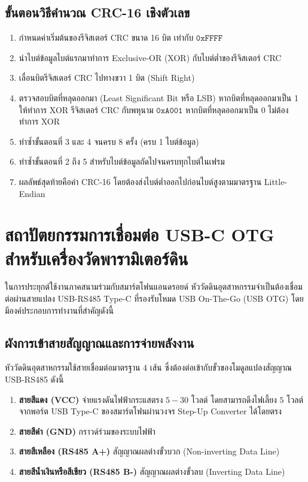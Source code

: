 \subsection{ขั้นตอนวิธีคำนวณ CRC-16 เชิงตัวเลข}
\begin{enumerate}
    \item กำหนดค่าเริ่มต้นของรีจิสเตอร์ CRC ขนาด 16 บิต เท่ากับ $\mathtt{0xFFFF}$
    \item นำไบต์ข้อมูลไบต์แรกมาทำการ Exclusive-OR (XOR) กับไบต์ต่ำของรีจิสเตอร์ CRC
    \item เลื่อนบิตรีจิสเตอร์ CRC ไปทางขวา 1 บิต (Shift Right)
    \item ตรวจสอบบิตที่หลุดออกมา (Least Significant Bit หรือ LSB)
    หากบิตที่หลุดออกมาเป็น 1 ให้ทำการ XOR รีจิสเตอร์ CRC กับพหุนาม $\mathtt{0xA001}$
    หากบิตที่หลุดออกมาเป็น 0 ไม่ต้องทำการ XOR
    \item ทำซ้ำขั้นตอนที่ 3 และ 4 จนครบ 8 ครั้ง (ครบ 1 ไบต์ข้อมูล)
    \item ทำซ้ำขั้นตอนที่ 2 ถึง 5 สำหรับไบต์ข้อมูลถัดไปจนครบทุกไบต์ในเฟรม
    \item ผลลัพธ์สุดท้ายคือค่า CRC-16 โดยต้องส่งไบต์ต่ำออกไปก่อนไบต์สูงตามมาตรฐาน Little-Endian
\end{enumerate}

\section{สถาปัตยกรรมการเชื่อมต่อ USB-C OTG สำหรับเครื่องวัดพารามิเตอร์ดิน}

ในการประยุกต์ใช้งานภาคสนามร่วมกับสมาร์ตโฟนแอนดรอยด์ หัววัดดินอุตสาหกรรมจำเป็นต้องเชื่อมต่อผ่านสายแปลง USB-RS485 Type-C ที่รองรับโหมด USB On-The-Go (USB OTG) โดยมีองค์ประกอบการทำงานที่สำคัญดังนี้

\subsection{ผังการเข้าสายสัญญาณและการจ่ายพลังงาน}
หัววัดดินอุตสาหกรรมใช้สายเชื่อมต่อมาตรฐาน 4 เส้น ซึ่งต้องต่อเข้ากับขั้วของโมดูลแปลงสัญญาณ USB-RS485 ดังนี้
\begin{enumerate}
    \item \textbf{สายสีแดง (VCC)} จ่ายแรงดันไฟฟ้ากระแสตรง $5 - 30\text{ โวลต์}$ โดยสามารถดึงไฟเลี้ยง $5\text{ โวลต์}$ จากพอร์ต USB Type-C ของสมาร์ตโฟนผ่านวงจร Step-Up Converter ได้โดยตรง
    \item \textbf{สายสีดำ (GND)} กราวด์ร่วมของระบบไฟฟ้า
    \item \textbf{สายสีเหลือง (RS485 A+)} สัญญาณผลต่างขั้วบวก (Non-inverting Data Line)
    \item \textbf{สายสีน้ำเงินหรือสีเขียว (RS485 B-)} สัญญาณผลต่างขั้วลบ (Inverting Data Line)
\end{enumerate}

